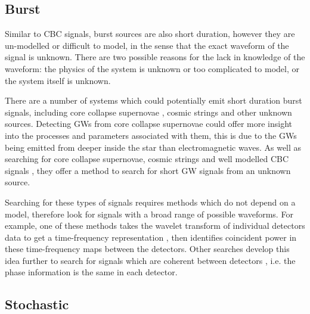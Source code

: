\subsection{\label{intro:sources:burst}Burst}

Similar to \gls{CBC} signals, burst sources are also short duration, however they are un-modelled or
difficult to model, in the sense that the exact waveform of the signal is
unknown.  There are two possible reasons for the lack in knowledge of the
waveform: the physics of the system is unknown or too complicated to model, or the system itself is unknown.  

There are a number of systems which could potentially emit short duration burst signals, including core collapse supernovae \citep{ott2008GravitationalWave}, cosmic strings
\citep{damour2005GravitationalRadiation} and other unknown sources.  Detecting
\glspl{GW} from core collapse supernovae could offer more insight into the processes
and parameters associated with them, this is due to the \glspl{GW} being emitted from deeper inside the star than electromagnetic waves.
As well as searching for core collapse supernovae, cosmic strings and well modelled \gls{CBC} signals \citep{aasi2014SearchGravitational}, they offer a method to search for short \gls{GW} signals from an unknown source. 

Searching for these types of signals requires methods which do not depend on a model, therefore look for signals with a broad range of possible waveforms.
For example, one of these methods takes the wavelet transform of individual detectors data to get a time-frequency representation \citep{klimenko2004PerformanceWaveBurst}, then identifies coincident power in these time-frequency maps between the detectors. 
Other searches develop this idea further to search for signals which are coherent between detectors \citep{cornish2015BayeswaveBayesian, klimenko2008CoherentMethod}, i.e. the phase information is the same in each detector.


\subsection{Stochastic}

